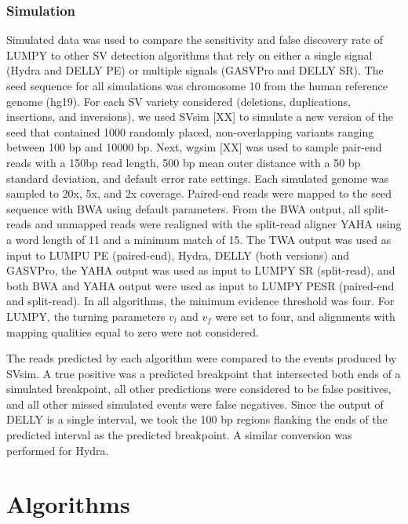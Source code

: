 \documentclass[11pt]{article}
\begin{document}
\subsubsection{Simulation}

Simulated data was used to compare the sensitivity and false discovery rate of
LUMPY to other SV detection algorithms that rely on either a single signal
(Hydra and DELLY PE) or multiple signals (GASVPro and DELLY SR).  The seed
sequence for all simulations was chromosome 10 from the human reference genome
(hg19).  For each SV variety considered (deletions, duplications, insertions,
and inversions), we used SVsim [XX] to simulate a new version of the seed that
contained 1000 randomly placed, non-overlapping variants ranging between 100 bp
and 10000 bp. Next, wgsim [XX] was used to sample pair-end reads with a 150bp
read length, 500 bp mean outer distance with a 50 bp standard deviation, and
default error rate settings.  Each simulated genome was sampled to 20x, 5x, and
2x coverage. Paired-end reads were mapped to the seed sequence with BWA using
default parameters.  From the BWA output, all split-reads and unmapped reads
were realigned with the split-read aligner YAHA using a word length of 11 and a
minimum match of 15. The TWA output was used as input to LUMPU PE
(paired-end), Hydra, DELLY (both versions) and GASVPro, the YAHA output was used
as input to LUMPY SR (split-read), and both BWA and YAHA output were used as
input to LUMPY PESR (paired-end and split-read).  In all algorithms, the
minimum evidence threshold was four.  For LUMPY, the turning parameters $v_l$
and $v_f$ were set to four, and alignments with mapping qualities equal to zero
were not considered.

The reads predicted by each algorithm were compared to the events produced by
SVsim.  A true positive was a predicted breakpoint that intersected both ends of
a simulated breakpoint, all other predictions were considered to be false
positives, and all other missed simulated events were false negatives.  Since
the output of DELLY is a single interval, we took the 100 bp regions flanking
the ends of the predicted interval as the predicted breakpoint.  A similar
conversion was performed for Hydra.





\appendix
\section{Algorithms}
\end{document}
